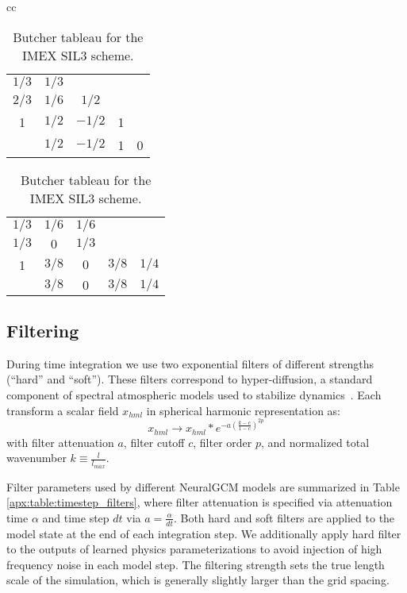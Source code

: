 \documentclass[sn-nature,Numbered]{sn-jnl}%
\begin{document}
\begin{appendices}
\begin{table}[h]
\begin{tabular}{ cc }
    \begin{tabular}{c|cccc}
    $1 / 3$ & $1 / 3$ & & & \\
    $2 / 3$ & $1 / 6$ & $1 / 2$ & & \\
    1 & $1 / 2$ & $-1 / 2$ & 1 & \\
    \hline & $1 / 2$ & $-1 / 2$ & 1 & 0 
    \end{tabular}
    \begin{tabular}{c|cccc}
    $1 / 3$ & $1 / 6$ & $1 / 6$ & & \\
    $1 / 3$ & $0$ & $1 / 3$ & & \\
    1 & $3 / 8$ & $0$ & $3 / 8$ & $1 / 4$ \\
    \hline & $3 / 8$ & $0$ & $3 / 8$ & $1 / 4$
    \end{tabular}
\end{tabular}
\caption{Butcher tableau for the IMEX SIL3 scheme.}\label{apx:table:butcher_tableau}
\end{table}

\subsection{Filtering}\label{apx:subsec:timestep_filtering}
During time integration we use two exponential filters of different strengths (``hard'' and ``soft'').
These filters correspond to hyper-diffusion, a standard component of spectral atmospheric models used to stabilize dynamics~. 
Each transform a scalar field $x_{hml}$ in spherical harmonic representation as:
\begin{equation}
    x_{hml} \rightarrow x_{hml} * e^{-a\left(\frac{k-c}{1-c}\right)^{2p}}
\end{equation}
with filter attenuation $a$, filter cutoff $c$, filter order $p$, and normalized total wavenumber $k\equiv\frac{l}{l_{max}}$.

Filter parameters used by different NeuralGCM models are summarized in Table \ref{apx:table:timestep_filters}, where filter attenuation is specified via attenuation time $\alpha$ and time step $dt$ via $a=\frac{\alpha}{dt}$. Both hard and soft filters are applied to the model state at the end of each integration step. We additionally apply hard filter to the outputs of learned physics parameterizations to avoid injection of high frequency noise in each model step. The filtering strength sets the true length scale of the simulation, which is generally slightly larger than the grid spacing.


\end{appendices}
\end{document}
